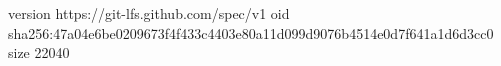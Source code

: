 version https://git-lfs.github.com/spec/v1
oid sha256:47a04e6be0209673f4f433c4403e80a11d099d9076b4514e0d7f641a1d6d3cc0
size 22040
